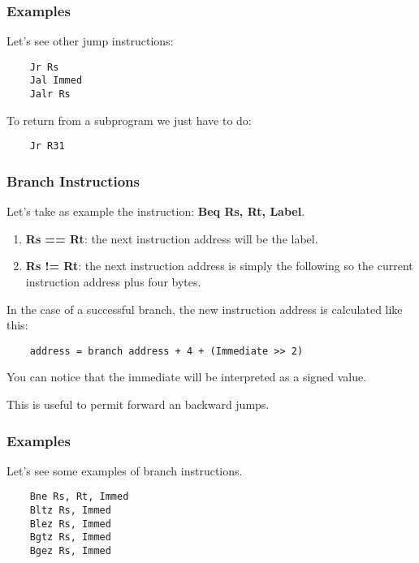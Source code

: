 
\begin{frame}[containsverbatim]
  \frametitle{Examples}

  Let's see other jump instructions:

  \begin{verbatim}
    Jr Rs
    Jal Immed
    Jalr Rs
  \end{verbatim}

  To return from a subprogram we just have to do:

  \begin{verbatim}
    Jr R31
  \end{verbatim}
\end{frame}


\begin{frame}[containsverbatim]
  \frametitle{Branch Instructions}

  Let's take as example the instruction: \textbf{Beq Rs, Rt, Label}.

  \begin{enumerate}
    \item
      \textbf{Rs == Rt}: the next instruction address will be the label.
    \item
      \textbf{Rs != Rt}: the next instruction address is simply the following
      so the current instruction address plus four bytes.
  \end{enumerate}

  \nl

  In the case of a successful branch, the new instruction address is
  calculated like this:

  \begin{verbatim}
    address = branch address + 4 + (Immediate >> 2)
  \end{verbatim}

  You can notice that the immediate will be interpreted as a signed value.

  \nl

  This is useful to permit forward an backward jumps.
\end{frame}


\begin{frame}[containsverbatim]
  \frametitle{Examples}

  Let's see some examples of branch instructions.

  \begin{verbatim}
    Bne Rs, Rt, Immed
    Bltz Rs, Immed
    Blez Rs, Immed
    Bgtz Rs, Immed
    Bgez Rs, Immed
  \end{verbatim}
\end{frame}

